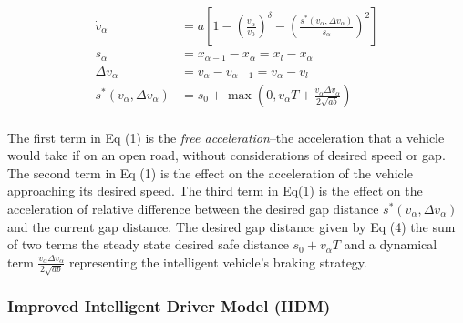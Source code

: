 \documentclass[12pt]{article}
\begin{document}
\begin{mymathbox}[ams gather, title=IDM Governing Equations, colframe=blue!30!black]
  \begin{align}
  \dot{v}_\alpha &= a \left[1 - \left(\frac{v_\alpha}{v_0}\right)^{\delta} - \left(\frac{s^*(v_\alpha,\Delta v_\alpha)}{s_\alpha}\right)^{2}\right]\\
  s_\alpha &= x_{\alpha-1}-x_\alpha=x_{l}-x_\alpha\\
  \Delta v_\alpha &=v_\alpha-v_{\alpha-1}=v_\alpha-v_l\\
  s^*(v_\alpha, \Delta v_\alpha) &= s_0 + \max\left(0, v_\alpha T + \frac{v_\alpha \Delta v_\alpha}{2 \sqrt{ab}} \right)
  \end{align}
\end{mymathbox}
\paragraph{}
The first term in Eq (1) is the \textit{free acceleration}\---the acceleration that a vehicle would take if on an open road, without considerations of desired speed or gap.  The second term in Eq (1) is the effect on the acceleration of the vehicle approaching its desired speed.  The third term in Eq(1) is the effect on the acceleration of relative difference between the desired gap distance $s^*(v_\alpha,\Delta v_\alpha)$ and the current gap distance.  The desired gap distance given by Eq (4) the sum of two terms the steady state desired safe distance $s_0+v_\alpha T$ and a dynamical term $\frac{v_\alpha \Delta v_\alpha}{2 \sqrt{ab}}$ representing the intelligent vehicle's braking strategy.

\subsubsection{Improved Intelligent Driver Model (IIDM)}
\end{document}
